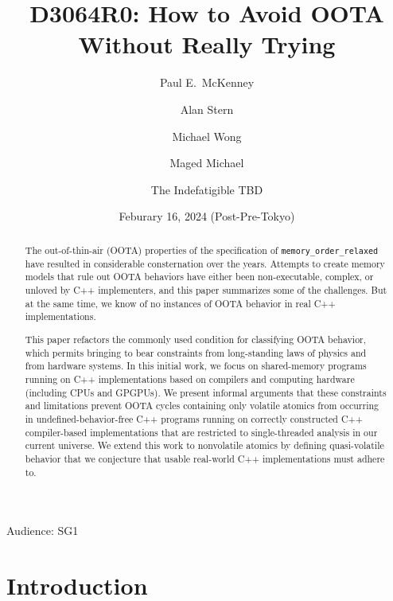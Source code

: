 \documentclass[10]{article}
\begin{document}
\title{D3064R0: How to Avoid OOTA Without Really Trying}

\newcommand{\co}[1]{\lstinline[breaklines=yes,breakatwhitespace=yes]{#1}}

\author{
Paul E.~McKenney\\{\small {}} \and
Alan Stern\\{\small {}} \and
Michael Wong\\{\small {}} \and
Maged Michael\\{\small {}} \and
The Indefatigible TBD
}
\date{Feburary 16, 2024 (Post-Pre-Tokyo)}
\maketitle{}

Audience: SG1

\begin{abstract}
	The out-of-thin-air (OOTA) properties of the specification
	of \co{memory_order_relaxed} have resulted in considerable
	consternation over the years.
	Attempts to create memory models that rule out OOTA behaviors
	have either been non-executable, complex, or unloved by C++
	implementers, and this paper summarizes some of the challenges.
	But at the same time, we know of no instances of OOTA behavior
	in real C++ implementations.

	This paper refactors the commonly used condition for classifying
	OOTA behavior, which permits bringing to bear constraints from
	long-standing laws of physics and from hardware systems.
	In this initial work, we focus on shared-memory programs running
	on C++ implementations based on compilers and computing hardware
	(including CPUs and GPGPUs).
	We present informal arguments that these constraints and
	limitations prevent OOTA cycles containing only volatile atomics
	from occurring in undefined-behavior-free C++ programs running on
	correctly constructed C++ compiler-based implementations that are
	restricted to single-threaded analysis in our current universe.
	We extend this work to nonvolatile atomics by defining
	quasi-volatile behavior that we conjecture that usable real-world
	C++ implementations must adhere to.
\end{abstract}

\pagebreak

\tableofcontents

\pagebreak

\section{Introduction}
\label{sec:Introduction}
\end{document}
